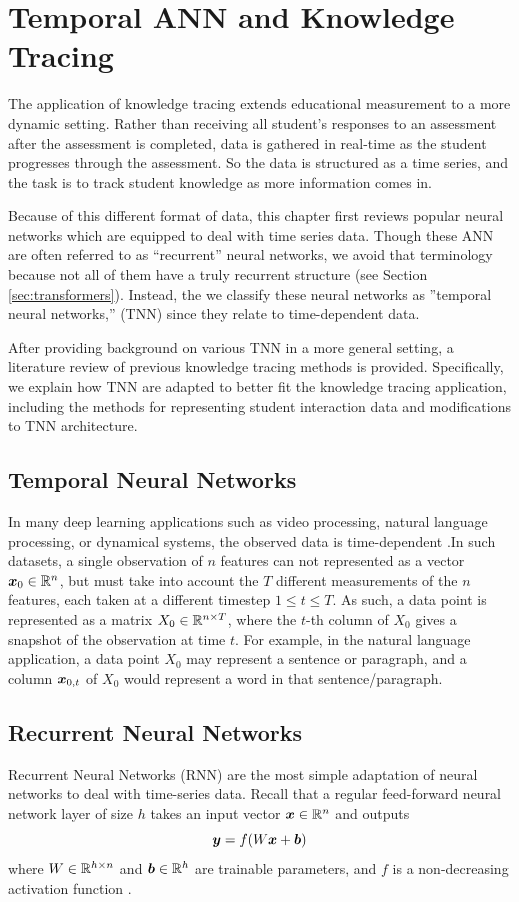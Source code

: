 \chapter{Temporal ANN and Knowledge Tracing}
The application of knowledge tracing extends educational measurement to a more dynamic setting. Rather than receiving all student's responses to an assessment after the assessment is completed, data is gathered in real-time as the student progresses through the assessment. So the data is structured as a time series, and the task is to track student knowledge as more information comes in.

Because of this different format of data, this chapter first reviews popular neural networks which are equipped to deal with time series data. Though these ANN are often referred to as ``recurrent'' neural networks, we avoid that terminology because not all of them have a truly recurrent structure (see Section \ref{sec:transformers}). Instead, the we classify these neural networks as ''temporal neural networks,'' (TNN) since they relate to time-dependent data.

After providing background on various TNN in a more general setting, a literature review of previous knowledge tracing methods is provided. Specifically, we explain how TNN are adapted to better fit the knowledge tracing application, including the methods for representing student interaction data and modifications to TNN architecture.


\section*{Temporal Neural Networks}
In many deep learning applications such as video processing, natural language processing, or dynamical systems, the observed data is time-dependent \cite{kahou2015} \cite{vaswani2017} \cite{gilpin2020}.In such datasets, a single observation of $n$ features can not represented as a vector $\boldsymbol{x}_0 \in \mathbb{R}^n$, but must take into account the $T$ different measurements of the $n$ features, each taken at a different timestep $1 \leq t \leq T$. As such, a data point is represented as a matrix $X_0 \in \mathbb{R}^{n \times T}$, where the $t$-th column of $X_0$ gives a snapshot of the observation at time $t$. For example, in the natural language application, a data point $X_0$ may represent a sentence or paragraph, and a column $\boldsymbol{x}_{0,t}$ of $X_0$ would represent a word in that sentence/paragraph.

\section{Recurrent Neural Networks}
Recurrent Neural Networks (RNN) are the most simple adaptation of neural networks to deal with time-series data. Recall that a regular feed-forward neural network layer of size $h$ takes an input vector $\boldsymbol{x} \in \mathbb{R}^n$ and outputs
\begin{equation}
  \boldsymbol{y} = f( W\boldsymbol{x} + \boldsymbol{b})
  \label{eq:ffn_layer}
\end{equation}
where $W \in \mathbb{R}^{h \times n}$ and $\boldsymbol{b} \in \mathbb{R}^h$ are trainable parameters, and $f$ is a non-decreasing activation function \cite{sharma2020}. 

